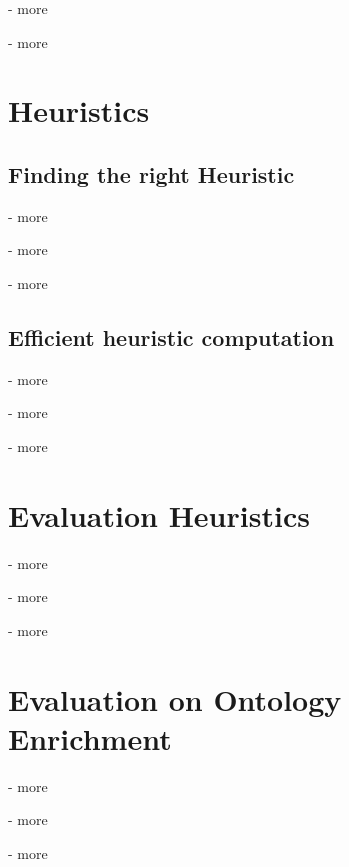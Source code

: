 - more

- more






\section{Heuristics}
\subsection{Finding the right Heuristic}
- more

- more

- more
\subsection{Efficient heuristic computation}
- more

- more

- more




\section{Evaluation Heuristics}
- more

- more

- more




\section{Evaluation on Ontology Enrichment}
- more

- more

- more


